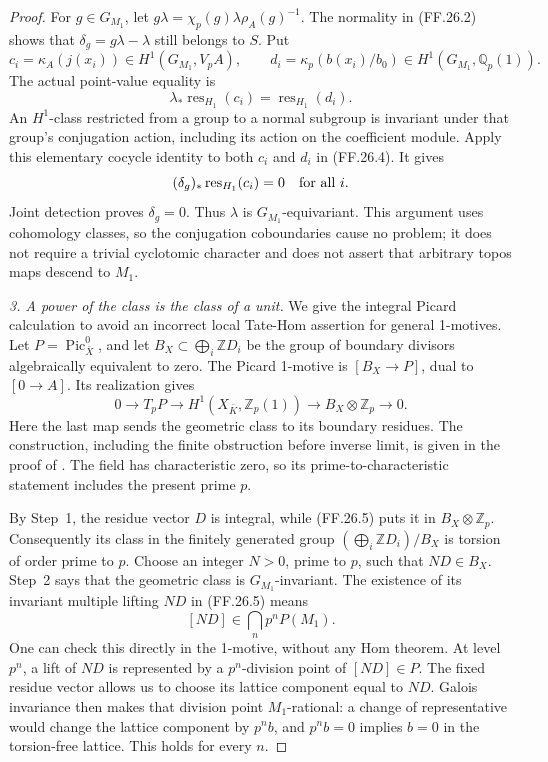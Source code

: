 \begin{proof}
For \(g\in G_{M_1}\), let
\(g\lambda=\chi_p(g)\lambda\rho_A(g)^{-1}\).
The normality in (FF.26.2) shows that
\(\delta_g=g\lambda-\lambda\) still belongs to \(S\).
Put
\[
 c_i=\kappa_A(j(x_i))\in H^1(G_{M_1},V_pA),\qquad
 d_i=\kappa_p(b(x_i)/b_0)\in H^1(G_{M_1},\mathbb Q_p(1)).
\]
The actual point-value equality is
\[
                \lambda_*\operatorname{res}_{H_1}(c_i)
                        =\operatorname{res}_{H_1}(d_i). \tag{FF.26.4}
\]
An \(H^1\)-class restricted from a group to a normal
subgroup is invariant under that group's conjugation
action, including its action on the coefficient module.
Apply this elementary cocycle identity to both \(c_i\)
and \(d_i\) in (FF.26.4). It gives
\[
               (\delta_g)_*\operatorname{res}_{H_1}(c_i)=0
                                      \quad\hbox{for all }i.
\]
Joint detection proves \(\delta_g=0\). Thus \(\lambda\)
is \(G_{M_1}\)-equivariant. This argument uses cohomology
classes, so the conjugation coboundaries cause no problem;
it does not require a trivial cyclotomic character and
does not assert that arbitrary topos maps descend to
\(M_1\).

\emph{3. A power of the class is the class of a unit.}
We give the integral Picard calculation to avoid an
incorrect local Tate-Hom assertion for general 1-motives.
Let \(P=\operatorname{Pic}^0_{\bar X}\), and let
\(B_X\subset\bigoplus_i\mathbb ZD_i\) be the group
of boundary divisors algebraically equivalent to zero.
The Picard 1-motive is \([B_X\to P]\), dual to
\([0\to A]\). Its realization gives
\[
 0\longrightarrow T_pP\longrightarrow
 H^1(X_{\bar K},\mathbb Z_p(1))\longrightarrow
 B_X\otimes\mathbb Z_p\longrightarrow0.                \tag{FF.26.5}
\]
Here the last map sends the geometric class to its
boundary residues. The construction, including the
finite obstruction before inverse limit, is given in
the proof of \citet[Proposition~4.1]{FF_SpiessSzamuely2003}.
The field has characteristic zero, so its prime-to-characteristic
statement includes the present prime \(p\).

By Step~1, the residue vector \(D\) is integral, while
(FF.26.5) puts it in \(B_X\otimes\mathbb Z_p\).
Consequently its class in the finitely generated group
\((\bigoplus_i\mathbb ZD_i)/B_X\) is torsion of order
prime to \(p\). Choose an integer \(N>0\), prime
to \(p\), such that \(ND\in B_X\).
Step~2 says that the geometric class is
\(G_{M_1}\)-invariant. The existence of its invariant
multiple lifting \(ND\) in (FF.26.5) means
\[
                 [ND]\in\bigcap_n p^nP(M_1).           \tag{FF.26.6}
\]
One can check this directly in the 1-motive, without
any Hom theorem. At level \(p^n\), a lift of \(ND\)
is represented by a \(p^n\)-division point of
\([ND]\in P\). The fixed residue vector allows us
to choose its lattice component equal to \(ND\).
Galois invariance then makes that division point
\(M_1\)-rational: a change of representative would
change the lattice component by \(p^n b\), and
\(p^n b=0\) implies \(b=0\) in the torsion-free
lattice. This holds for every \(n\).


\end{proof}
